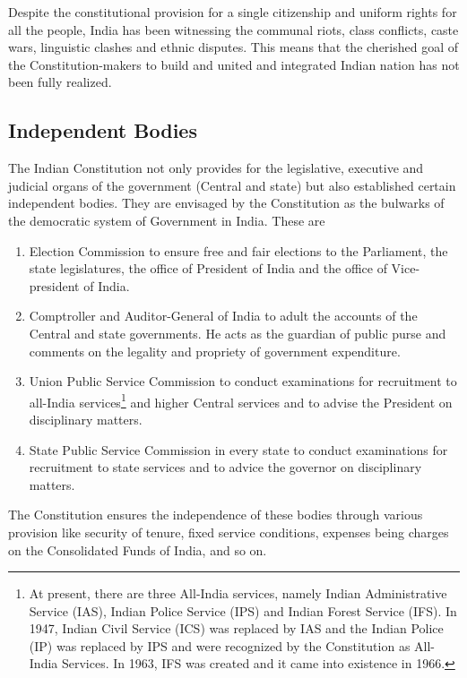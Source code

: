 Despite the constitutional provision for a single citizenship and uniform rights for all the people, India has been witnessing the communal riots, class conflicts, caste wars, linguistic clashes and ethnic disputes. This means that the cherished goal of the Constitution-makers to build and united and integrated Indian nation has not been fully realized.

\subsection{Independent Bodies}

The Indian Constitution not only provides for the legislative, executive and judicial organs of the government (Central and state) but also established certain independent bodies. They are envisaged by the Constitution as the bulwarks of the democratic system of Government in India. These are

\renewcommand{\labelenumi}{\textbf{(\alph{enumi})}}
\begin{enumerate}
  \item Election Commission to ensure free and fair elections to the Parliament, the state legislatures, the office of President of India and the office of Vice-president of India.
  \item Comptroller and Auditor-General of India to adult the accounts of the Central and state governments. He acts as the guardian of public purse and comments on the legality and propriety of government expenditure.
  \item Union Public Service Commission to conduct examinations for recruitment to all-India services\footnote{At present, there are three All-India services, namely Indian Administrative Service (IAS), Indian Police Service (IPS) and Indian Forest Service (IFS). In 1947, Indian Civil Service (ICS) was replaced by IAS and the Indian Police (IP) was replaced by IPS and were recognized by the Constitution as All-India Services. In 1963, IFS was created and it came into existence in 1966.} and higher Central services and to advise the President on disciplinary matters.
  \item State Public Service Commission in every state to conduct examinations for recruitment to state services and to advice the governor on disciplinary matters.
\end{enumerate}

The Constitution ensures the independence of these bodies through various provision like security of tenure, fixed service conditions, expenses being charges on the Consolidated Funds of India, and so on.

